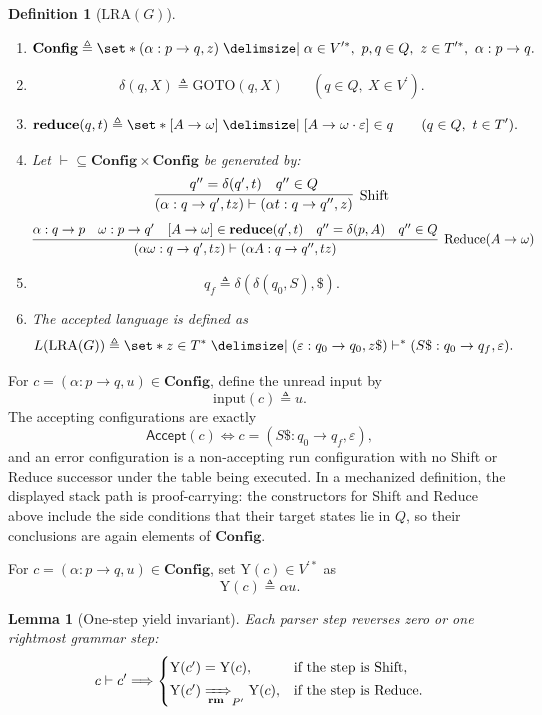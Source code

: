 \documentclass[11pt,a4paper]{article}
\theoremstyle{prettyplain}
\newtheorem{lemma}[theorem]{Lemma}
\theoremstyle{prettydef}
\newtheorem{definition}[theorem]{Definition}
\def\mid{\;\delimsize\vert\;}#1%
\newcommand{\eps}{\varepsilon}
\newcommand{\LRA}{\mathrm{LRA}}
\newcommand{\RMP}{\xRightarrow[\mathbf{rm}]{}_{P^\prime}}
\newcommand{\Path}[3]{#1:#2\to#3}
\newcommand{\Item}[2]{[#1\to #2]}
\newcommand{\Config}{\mathbf{Config}}
\newcommand{\Reduce}{\mathbf{reduce}}
\begin{document}
\begin{definition}[$\LRA(G)$]
\begin{enumerate}[label=\textup{(\roman*)}]
\item
\[
\Config
\triangleq
\set*{(\Path{\alpha}{p}{q},z)
\mid
\alpha\in V^{\prime *},\ p,q\in Q,\ z\in T^{\prime *},\
\Path{\alpha}{p}{q}}.
\]

\item
\[
\delta(q,X)\triangleq \mathrm{GOTO}(q,X)
\qquad(q\in Q,\ X\in V^\prime).
\]

\item
\[
\Reduce(q,t)
\triangleq
\set*{\Item{A}{\omega}
\mid
\Item{A}{\omega\cdot\eps}\in q}
\qquad(q\in Q,\ t\in T^\prime).
\]

\item Let \({\vdash}\subseteq\Config\times\Config\) be generated by:
\[
\infer[\mathrm{Shift}]
  {(\Path{\alpha}{q}{q^\prime},tz)
    \vdash
   (\Path{\alpha t}{q}{q^{\prime\prime}},z)}
  {q^{\prime\prime}=\delta(q^\prime,t) & q^{\prime\prime}\in Q}
\]
\[
\infer[\mathrm{Reduce}(A\to\omega)]
  {(\Path{\alpha\omega}{q}{q^\prime},tz)
    \vdash
   (\Path{\alpha A}{q}{q^{\prime\prime}},tz)}
  {\Path{\alpha}{q}{p}
   &
   \Path{\omega}{p}{q^\prime}
   &
   \Item{A}{\omega}\in\Reduce(q^\prime,t)
   &
   q^{\prime\prime}=\delta(p,A)
   &
   q^{\prime\prime}\in Q}
\]

\item
\[
q_f\triangleq\delta(\delta(q_0,S),\$).
\]

\item The accepted language is defined as
\[
L(\LRA(G))
\triangleq
\set*{z\in T^*
\mid
(\Path{\eps}{q_0}{q_0},z\$)
\vdash^*
(\Path{S\$}{q_0}{q_f},\eps)}.
\]
\end{enumerate}
\end{definition}

For \(c=(\Path{\alpha}{p}{q},u)\in\Config\), define the unread input by
\[
\mathrm{input}(c)\triangleq u .
\]
The accepting configurations are exactly
\[
\mathsf{Accept}(c)
\Longleftrightarrow
c=(\Path{S\$}{q_0}{q_f},\eps),
\]
and an error configuration is a non-accepting run configuration with no Shift or
Reduce successor under the table being executed.  In a mechanized definition,
the displayed stack path is proof-carrying: the constructors for Shift and
Reduce above include the side conditions that their target states lie in \(Q\),
so their conclusions are again elements of \(\Config\).

For \(c=(\Path{\alpha}{p}{q},u)\in\Config\), set $\mathrm{Y}(c) \in V^{\prime *}$ as
\[
\mathrm{Y}(c)\triangleq\alpha u.
\]

\begin{lemma}[One-step yield invariant]\label{lem:lra-one-step-yield}
Each parser step reverses zero or one rightmost grammar step:
\begin{equation}\label{eq:one-step-yield}
c\vdash c'
\Longrightarrow
\begin{cases}
\mathrm{Y}(c')=\mathrm{Y}(c),
  &\text{if the step is Shift},\\[2pt]
\mathrm{Y}(c')\RMP\mathrm{Y}(c),
  &\text{if the step is Reduce}.
\end{cases}
\end{equation}
\end{lemma}
\end{document}

